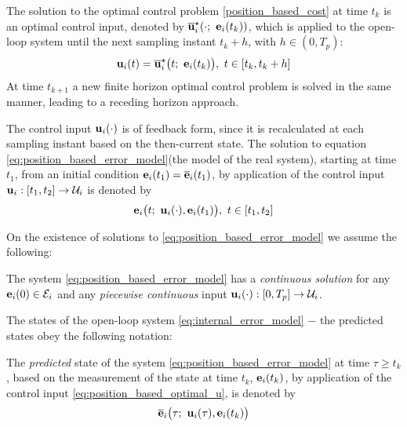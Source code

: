 The solution to the optimal control problem \eqref{position_based_cost}
at time $t_k$ is an optimal control input, denoted by
$\overline{\bm{\mathbf{u}}}_i^{\star}(\cdot;\ \bm{\mathbf{e}}_i(t_k))$, which
is applied to the open-loop system until the next sampling instant $t_k + h$,
with $h \in (0,T_p)$:
\begin{align}
  \bm{\mathbf{u}}_i(t) = \overline{\bm{\mathbf{u}}}_i^{\star}\big(t;\ \bm{\mathbf{e}}_i(t_k)\big),\  t \in [t_k, t_k + h]
 \label{eq:position_based_optimal_u}
\end{align}
At time $t_{k+1}$ a new finite horizon optimal control problem is solved in the
same manner, leading to a receding horizon approach.

The control input $\bm{\mathbf{u}}_i(\cdot)$ is of feedback form,
since it is recalculated at each sampling instant based on the then-current
state. The solution to equation \eqref{eq:position_based_error_model}(the model
of the real system), starting at time $t_1$, from an initial condition
$\bm{\mathbf{e}}_i(t_1) = \overline{\bm{\mathbf{e}}}_i(t_1)$,
by application of the control input $\bm{\mathbf{u}}_i : [t_1, t_2] \to \mathcal{U}_i$
is denoted by
\begin{align}
  \bm{\mathbf{e}}_i\big(t;\ \bm{\mathbf{u}}_i(\cdot), \bm{\mathbf{e}}_i(t_1)\big),\ t \in [t_1, t_2]
\end{align}


On the existence of solutions to \eqref{eq:position_based_error_model} we
assume the following:
\begin{bw_box}
\begin{assumption}
  \label{ass:existence_of_solutions_without_disturbance}

  The system \eqref{eq:position_based_error_model} has a
  \textit{continuous solution} for any $\bm{\mathbf{e}}_i(0) \in \mathcal{E}_i$ and
  any \textit{piecewise continuous} input
  $\bm{\mathbf{u}}_i(\cdot) :[0,T_p] \to \mathcal{U}_i$.
\end{assumption}
\end{bw_box}

The states of the open-loop system \eqref{eq:internal_error_model} $-$ the
predicted states obey the following notation:
\begin{bw_box}
\begin{remark}
The \textit{predicted} state of the system \eqref{eq:position_based_error_model}
at time $\tau \geq t_k$ , based on the measurement of the state at time
$t_k$, $\bm{\mathbf{e}}_i(t_k)$, by application of the control input
\eqref{eq:position_based_optimal_u}, is denoted by
\begin{align}
  \overline{\bm{\mathbf{e}}}_i\big(\tau;\ \bm{\mathbf{u}}_i(\tau), \bm{\mathbf{e}}_i(t_k)\big) \label{eq:position_based_predicted_error_0}
\end{align}
\end{remark}
\end{bw_box}


